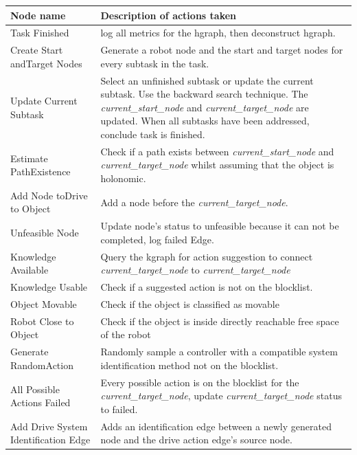 \begin{table}[H]
\centering
{}
\begin{tabular}%
  {>{\raggedright\arraybackslash}p{}%
    >{\raggedright\arraybackslash}p{}}
\textbf{Node name} & \textbf{Description of actions taken}\\\toprule
Task Finished & log all metrics for the \ac{hgraph}, then deconstruct \ac{hgraph}.\\
Create Start and\newline Target Nodes & Generate a robot node and the start and target nodes for every subtask in the task.\\
Update Current Subtask & Select an unfinished subtask or update the current subtask. Use the backward search technique. The \textit{current\_start\_node} and \textit{current\_target\_node} are updated. When all subtasks have been addressed, conclude task is finished. \\
Estimate Path\newline Existence & Check if a path exists between \textit{current\_start\_node} and \textit{current\_target\_node} whilst assuming that the object is holonomic.\\
Add Node to\newline Drive to Object & Add a node before the \textit{current\_target\_node}.\\
Unfeasible Node & Update node's status to unfeasible because it can not be completed, log failed Edge.\\
Knowledge Available& Query the \ac{kgraph} for action suggestion to connect \textit{current\_target\_node} to \textit{current\_target\_node}\\
Knowledge Usable& Check if a suggested action is not on the blocklist.\\
Object Movable & Check if the object is classified as movable\\
Robot Close to Object& Check if the object is inside directly reachable free space of the robot \\
Generate Random\newline Action& Randomly sample a controller with a compatible system identification method not on the blocklist. \\
All Possible Actions Failed & Every possible action is on the blocklist for the \textit{current\_target\_node}, update \textit{current\_target\_node} status to failed.\\
Add Drive System Identification Edge & Adds an identification edge between a newly generated node and the drive action edge's source node. \\

\end{tabular}
\end{table}
